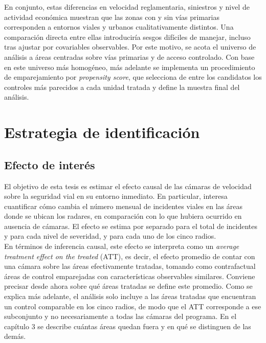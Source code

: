 En conjunto, estas diferencias en velocidad reglamentaria, siniestros y nivel de actividad económica muestran que las zonas con y sin vías primarias corresponden a entornos viales y urbanos cualitativamente distintos. Una comparación directa entre ellas introduciría sesgos difíciles de manejar, incluso tras ajustar por covariables observables. Por este motivo, se acota el universo de análisis a áreas centradas sobre vías primarias y de acceso controlado. Con base en este universo más homogéneo, más adelante se implementa un procedimiento de emparejamiento por \textit{propensity score}, que selecciona de entre los candidatos los controles más parecidos a cada unidad tratada y define la muestra final del análisis.

\section{Estrategia de identificación}

\subsection{Efecto de interés}
\noindent El objetivo de esta tesis es estimar el efecto causal de las cámaras de velocidad sobre la seguridad vial en su entorno inmediato. En particular, interesa cuantificar cómo cambia el número mensual de incidentes viales en las áreas donde se ubican los radares, en comparación con lo que hubiera ocurrido en ausencia de cámaras. El efecto se estima por separado para el total de incidentes y para cada nivel de severidad, y para cada uno de los cinco radios.\\

En términos de inferencia causal, este efecto se interpreta como un \emph{average treatment effect on the treated} (ATT), es decir, el efecto promedio de contar con una cámara sobre las áreas efectivamente tratadas, tomando como contrafactual áreas de control emparejadas con características observables similares. Conviene precisar desde ahora sobre qué áreas tratadas se define este promedio. Como se explica más adelante, el análisis solo incluye a las áreas tratadas que encuentran un control comparable en los cinco radios, de modo que el ATT corresponde a ese subconjunto y no necesariamente a todas las cámaras del programa. En el capítulo 3 se describe cuántas áreas quedan fuera y en qué se distinguen de las demás.\\

